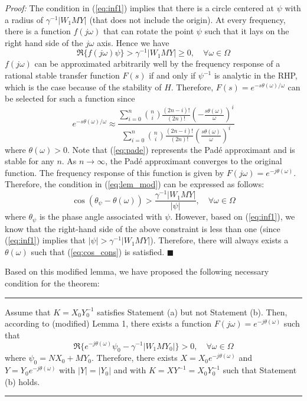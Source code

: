 \documentclass[12pt]{article}
\begin{document}
\textit{Proof:}
The condition in (\ref{eq:inf1}) implies that there is a circle centered at $\psi$ with a radius of $\gamma^{-1}|W_1MY|$ (that does not include the origin). At every frequency, there is a function $f(j\omega)$ that can rotate the point $\psi$ such that it lays on the right hand side of the $j\omega$ axis. Hence we have
\begin{equation}
\Re \{ f(j\omega)\psi\}>\gamma^{-1}|W_1MY|\geq 0, \quad \forall \omega \in \Omega
\end{equation}
$f(j\omega)$ can be approximated arbitrarily well by the frequency response of a rational stable transfer function $F(s)$ if and only if $\psi^{-1}$ is analytic in the RHP, which is the case because of the stability of $H$. Therefore, $F(s) = e^{-s\theta(\omega)/\omega}$ can be selected for such a function since
\begin{equation} \label{eq:pade}
e^{-s\theta(\omega)/\omega} \approx \frac{\sum_{i=0}^n \binom ni \frac{(2n-i)!}{(2n)!} \left(-\frac{s\theta(\omega)}{\omega}\right)^i}{\sum_{i=0}^n \binom ni \frac{(2n-i)!}{(2n)!} \left(\frac{s\theta(\omega)}{\omega}\right)^i}
\end{equation}
where $\theta(\omega) > 0$.  Note that (\ref{eq:pade}) represents the Pad\'{e} approximant and is stable for any $n$. As $n \to \infty$, the Pad\'{e} approximant converges to the original function. The frequency response of this function is given by $F(j\omega) = e^{-j\theta(\omega)}$. Therefore, the condition in (\ref{eq:lem_mod}) can be expressed as follows:
\begin{equation} \label{eq:cos_cons}
\cos (\theta_\psi - \theta(\omega)) > \frac{\gamma^{-1}|W_1MY|}{|\psi|}, \quad \forall \omega \in \Omega
\end{equation} 
where $\theta_\psi$ is the phase angle associated with $\psi$. However, based on (\ref{eq:inf1}), we know that the right-hand side of the above constraint is less than one (since (\ref{eq:inf1}) implies that $|\psi| > \gamma^{-1}|W_1MY|$). Therefore, there will always exists a $\theta(\omega)$ such that (\ref{eq:cos_cons}) is satisfied. 
{\hfill \ensuremath{\blacksquare}}



Based on this modified lemma, we have proposed the following necessary condition for the theorem:
\vspace{0.2cm} \hrule 

Assume that $K = X_0Y_0^{-1}$ satisfies Statement (a) but not Statement (b). Then, according to (modified) Lemma 1, there exists a function $F(j\omega) = e^{-j\theta(\omega)}$ such that
\begin{equation}
\Re \{ e^{-j\theta(\omega)}\psi_0-\gamma^{-1}|W_1MY_0|\} > 0, \quad \forall \omega \in \Omega
\end{equation}
where $\psi_0 = NX_0 + MY_0$. Therefore, there exists $X = X_0e^{-j\theta(\omega)}$ and $Y = Y_0e^{-j\theta(\omega)}$ with $|Y| = |Y_0|$ and with $K = XY^{-1} = X_0Y_0^{-1}$ such that Statement (b) holds. 
\hrule \vspace{0.2cm}
\end{document}

